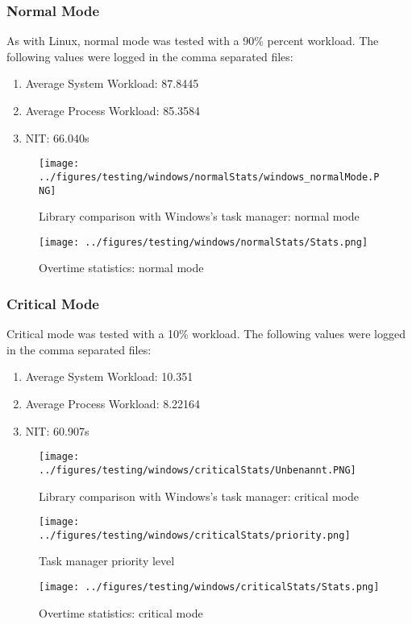 \subsubsection{Normal Mode}
As with Linux, normal mode was tested with a 90\% percent workload. The following values were logged in the comma separated files:
\begin{enumerate}
	\item Average System Workload: 87.8445
	\item Average Process Workload: 85.3584
	\item NIT: 66.040s
\end{enumerate}
\begin{figure}[!htbp]
	\centering
	\begin{minipage}[b]{\textwidth}
		\centering
		\texttt{[image: ../figures/testing/windows/normalStats/windows\_normalMode.PNG]}
		\caption{Library comparison with Windows's task manager: normal mode}
		\hspace{3mm}
	\end{minipage}
	\begin{minipage}[b]{\textwidth}
		\centering
		\texttt{[image: ../figures/testing/windows/normalStats/Stats.png]}
		\caption{Overtime statistics: normal mode}
	\end{minipage}
\end{figure}


\newpage
\subsubsection{Critical Mode}
Critical mode was tested with a 10\% workload. The following values were logged in the comma separated files:
\begin{enumerate}
	\item Average System Workload: 10.351
	\item Average Process Workload: 8.22164
	\item NIT: 60.907s 
\end{enumerate}
\begin{figure}[!htbp]
	\centering
	\begin{minipage}[b]{\textwidth}
		\centering
		\texttt{[image: ../figures/testing/windows/criticalStats/Unbenannt.PNG]}
		\caption{Library comparison with Windows's task manager: critical mode}
		\hspace{3mm}
	\end{minipage}
	\begin{minipage}[b]{\textwidth}
		\centering
		\texttt{[image: ../figures/testing/windows/criticalStats/priority.png]}
		\caption{Task manager priority level}
		\hspace{3mm}
	\end{minipage}
	\begin{minipage}[b]{\textwidth}
		\centering
		\texttt{[image: ../figures/testing/windows/criticalStats/Stats.png]}
		\caption{Overtime statistics: critical mode}
	\end{minipage}
\end{figure}
\newpage

